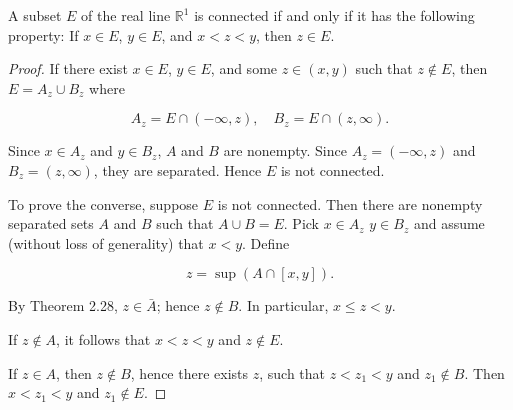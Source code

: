\begin{thm}
    A subset $E$ of the real line $\mathbb{R}^1$ is connected if and only if it has the following property: If $x \in E$, $y \in E$, and $x < z <y$, then $z \in E$.
\end{thm}

\begin{proof}
If there exist $x \in  E$, $y \in E$, and some $z \in (x, y)$ such that $z \not\in E$, then
$E = A_z \cup B_z$ where

\begin{equation*}
    A_z = E \cap (-\infty, z),\quad
    B_z = E \cap (z, \infty).
\end{equation*}


Since $x \in A_z$ and $y \in B_z$, $A$ and $B$ are nonempty. Since $A_z = (-\infty, z)$ and $B_z = (z, \infty)$, they are separated. Hence $E$ is not connected.

To prove the converse, suppose $E$ is not connected. Then there are
nonempty separated sets $A$ and $B$ such that $A \cup B=E$. Pick $x \in  A_z$ $y \in  B_z$
and assume (without loss of generality) that $x <y$. Define

\begin{equation*}
    z = \sup(A \cap [x, y]).
\end{equation*}

By Theorem 2.28, $z \in \bar{A}$; hence $z \not\in  B$. In particular, $x \leq z <y$.

If $z \not\in A$, it follows that $x < z < y$ and $z \not\in E$.

If $z \in  A$, then $z \not\in B$, hence there exists $z$, such that $z<z_1 <y$ and
$z_1 \not\in  B$. Then $x<z_1 <y$ and $z_1 \not\in  E$.
\end{proof}